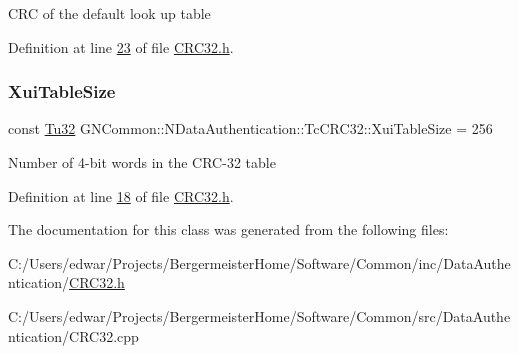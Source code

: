 C\+RC of the default look up table 

Definition at line \mbox{\hyperlink{_c_r_c32_8h_source_l00023}{23}} of file \mbox{\hyperlink{_c_r_c32_8h_source}{C\+R\+C32.\+h}}.

\mbox{\label{class_g_n_common_1_1_n_data_authentication_1_1_tc_c_r_c32_a520aaabe0f4ade7f38afd480281b2180}} 
\subsubsection{\texorpdfstring{Xui\+Table\+Size}{XuiTableSize}}
{\footnotesize\ttfamily const \mbox{\hyperlink{namespace_g_n_common_a941b527ef318f318aed7903dc832b7e4}{Tu32}} G\+N\+Common\+::\+N\+Data\+Authentication\+::\+Tc\+C\+R\+C32\+::\+Xui\+Table\+Size = 256\hspace{0.3cm}{\ttfamily [static]}}

Number of 4-\/bit words in the C\+R\+C-\/32 table 

Definition at line \mbox{\hyperlink{_c_r_c32_8h_source_l00018}{18}} of file \mbox{\hyperlink{_c_r_c32_8h_source}{C\+R\+C32.\+h}}.



The documentation for this class was generated from the following files\+:\begin{DoxyCompactItemize}
\item 
C\+:/\+Users/edwar/\+Projects/\+Bergermeister\+Home/\+Software/\+Common/inc/\+Data\+Authentication/\mbox{\hyperlink{_c_r_c32_8h}{C\+R\+C32.\+h}}\item 
C\+:/\+Users/edwar/\+Projects/\+Bergermeister\+Home/\+Software/\+Common/src/\+Data\+Authentication/C\+R\+C32.\+cpp\end{DoxyCompactItemize}
